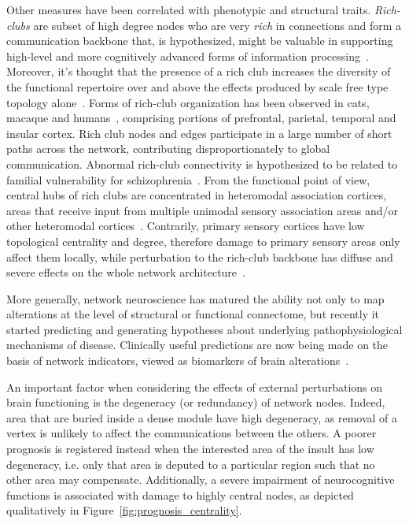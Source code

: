 Other measures have been correlated with phenotypic and structural traits.
\emph{Rich-clubs} are subset of high degree nodes who are very \emph{rich} in connections and form a communication backbone that, is hypothesized, might be valuable in supporting high-level and more cognitively advanced forms of information processing~\cite{collin2014}. Moreover, it's thought that the presence of a rich club increases the diversity of the functional repertoire over and above the effects produced by scale free type topology alone~\cite{senden2014}.
Forms of rich-club organization has been observed in cats, macaque and humans~\cite{vandenheuvel2011,harriger2012,dereus2013a,collin2014}, comprising portions of prefrontal, parietal, temporal and insular cortex. Rich club nodes and edges participate in a large number of short paths across the network, contributing disproportionately to global communication. 
Abnormal rich-club connectivity is hypothesized to be related  to familial vulnerability for schizophrenia~\cite{collin2014impaired}.
From the functional point of view, central hubs of rich clubs are concentrated in heteromodal association cortices, areas that receive input from multiple unimodal sensory association areas and/or other heteromodal cortices~\cite{kandel2013}. Contrarily, primary sensory cortices have low topological centrality and degree, therefore damage to primary sensory areas only affect them locally, while perturbation to the rich-club backbone has diffuse and severe effects on the whole network architecture~\cite{honey2008}.

More generally, network neuroscience has matured the ability not only to map alterations at the level of structural or functional connectome, but recently it started predicting and generating hypotheses about underlying pathophysiological mechanisms of disease. Clinically useful predictions are now being made on the basis of network indicators, viewed as biomarkers of brain alterations~\cite{fornito2015}.

An important factor when considering the effects of external perturbations on brain functioning is the degeneracy (or redundancy) of network nodes. Indeed, area that are buried inside a dense module have high degeneracy, as removal of a vertex is unlikely to affect the communications between the others. A poorer prognosis is registered instead when the interested area of the insult has low degeneracy, i.e. only that area is deputed to a particular region such that no other area may compensate.
Additionally, a severe impairment of neurocognitive functions is associated with damage to highly central nodes, as depicted qualitatively in Figure~\ref{fig:prognosis_centrality}.

